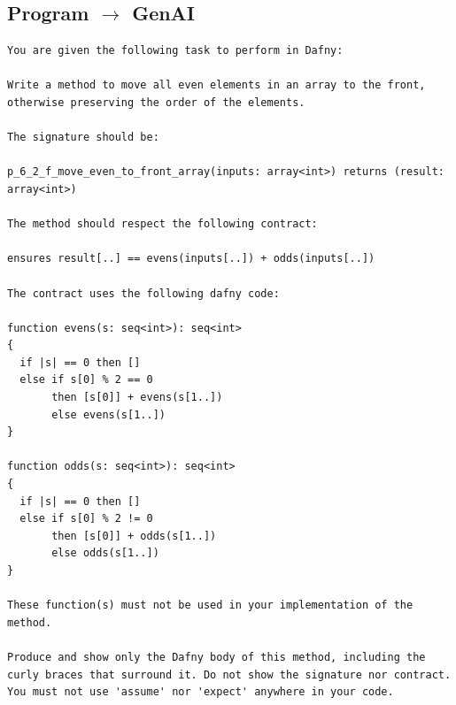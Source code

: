 \documentclass{article}
\begin{document}
\subsection*{Program $\rightarrow$ GenAI}
\begin{lstlisting}
You are given the following task to perform in Dafny:

Write a method to move all even elements in an array to the front, otherwise preserving the order of the elements.

The signature should be:

p_6_2_f_move_even_to_front_array(inputs: array<int>) returns (result: array<int>)

The method should respect the following contract:

ensures result[..] == evens(inputs[..]) + odds(inputs[..])

The contract uses the following dafny code:

function evens(s: seq<int>): seq<int>
{
  if |s| == 0 then []
  else if s[0] % 2 == 0
       then [s[0]] + evens(s[1..])
       else evens(s[1..])
}

function odds(s: seq<int>): seq<int>
{
  if |s| == 0 then []
  else if s[0] % 2 != 0
       then [s[0]] + odds(s[1..])
       else odds(s[1..])
}

These function(s) must not be used in your implementation of the method.

Produce and show only the Dafny body of this method, including the curly braces that surround it. Do not show the signature nor contract. You must not use 'assume' nor 'expect' anywhere in your code.
\end{lstlisting}
\end{document}
